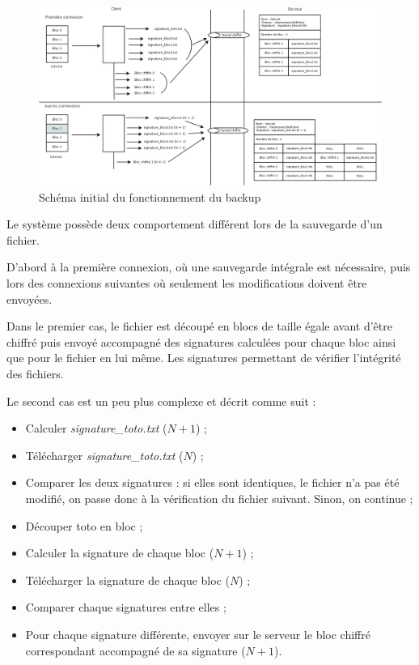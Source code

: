 \documentclass[a4paper,10pt, twoside]{report}
\begin{document}
\begin{spacing}{1.2}
\begin{figure}[h!]
    \hspace{-4.5em}
    \includegraphics[width=19cm]{algo/schemaInitial.png}
    \caption{\label{schemaInitial} Schéma initial du fonctionnement du backup}
\end{figure}

Le système possède deux comportement différent lors de la sauvegarde d'un fichier.

\bigskip

D'abord à la première connexion, où une sauvegarde intégrale est
nécessaire, puis lors des connexions suivantes où seulement les
modifications doivent être envoyées.

Dans le premier cas, le fichier est découpé en blocs de taille égale
avant d'être chiffré puis envoyé accompagné des signatures calculées
pour chaque bloc ainsi que pour le fichier en lui même. Les signatures
permettant de vérifier l'intégrité des fichiers.

Le second cas est un peu plus complexe et décrit comme suit :
\begin{itemize}
 \item Calculer \textit{signature\_toto.txt} (\(N + 1\)) ;
 \item Télécharger \textit{signature\_toto.txt} (\(N\)) ;
 \item Comparer les deux signatures : si elles sont identiques, le fichier n'a
 pas été modifié, on passe donc à la vérification du fichier suivant. Sinon,
 on continue ;
 \item Découper toto en bloc ;
 \item Calculer la signature de chaque bloc (\(N + 1\)) ;
 \item Télécharger la signature de chaque bloc (\(N\)) ;
 \item Comparer chaque signatures entre elles ;
 \item Pour chaque signature différente, envoyer sur le serveur le bloc
 chiffré correspondant accompagné de sa signature (\(N + 1\)).
\end{itemize}


\end{spacing}
\end{document}
